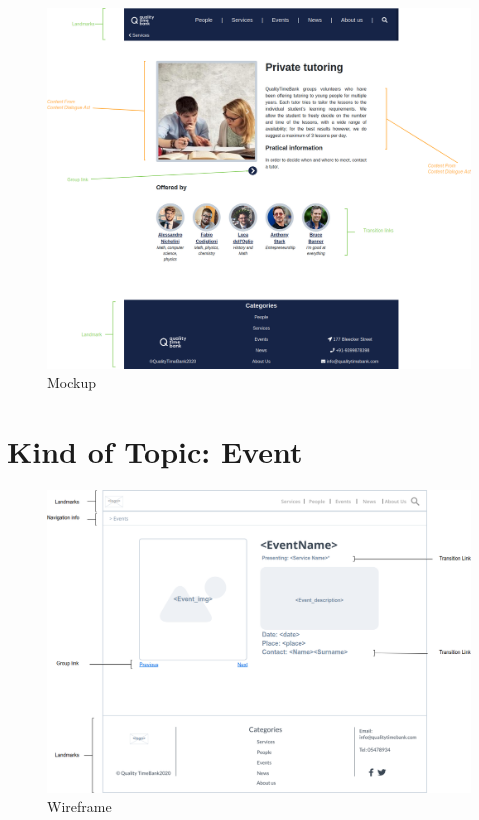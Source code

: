 \documentclass[a4paper, 11pt, parskip=half, headsepline]{scrreprt}
\begin{document}
\begin{figure}[H]
    \centering
    \includegraphics[width=1\linewidth, keepaspectratio]{mockups/ConcreteService}
    \caption{Mockup}
\end{figure}

\section{Kind of Topic: Event}

\begin{figure}[H]
    \centering
    \includegraphics[width=1\linewidth, keepaspectratio]{wireframes/KindOfTopic-Event}
    \caption{Wireframe}
\end{figure}
\end{document}
